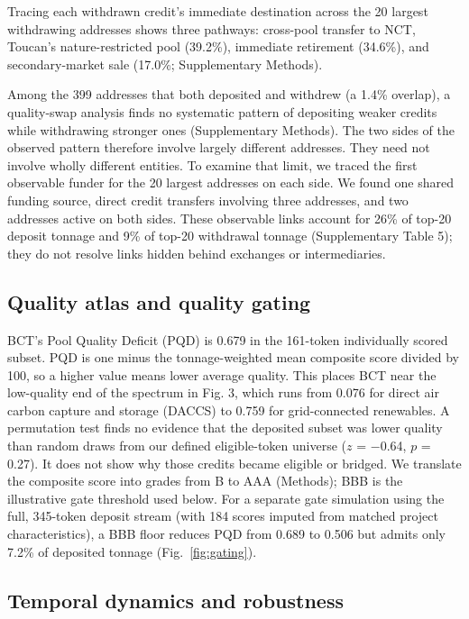 \documentclass[sn-nature,Numbered]{sn-jnl}
\begin{document}
Tracing each withdrawn credit's immediate destination across the 20 largest withdrawing addresses shows three pathways: cross-pool transfer to NCT, Toucan's nature-restricted pool (39.2\%), immediate retirement (34.6\%), and secondary-market sale (17.0\%; Supplementary Methods).

Among the 399 addresses that both deposited and withdrew (a 1.4\% overlap), a quality-swap analysis finds no systematic pattern of depositing weaker credits while withdrawing stronger ones (Supplementary Methods). The two sides of the observed pattern therefore involve largely different addresses. They need not involve wholly different entities. To examine that limit, we traced the first observable funder for the 20 largest addresses on each side. We found one shared funding source, direct credit transfers involving three addresses, and two addresses active on both sides. These observable links account for 26\% of top-20 deposit tonnage and 9\% of top-20 withdrawal tonnage (Supplementary Table 5); they do not resolve links hidden behind exchanges or intermediaries.

\subsection*{Quality atlas and quality gating}

BCT's Pool Quality Deficit (PQD) is 0.679 in the 161-token individually scored subset. PQD is one minus the tonnage-weighted mean composite score divided by 100, so a higher value means lower average quality. This places BCT near the low-quality end of the spectrum in Fig. 3, which runs from 0.076 for direct air carbon capture and storage (DACCS) to 0.759 for grid-connected renewables. A permutation test finds no evidence that the deposited subset was lower quality than random draws from our defined eligible-token universe ($z$ = $-$0.64, $p$ = 0.27). It does not show why those credits became eligible or bridged. We translate the composite score into grades from B to AAA (Methods); BBB is the illustrative gate threshold used below. For a separate gate simulation using the full, 345-token deposit stream (with 184 scores imputed from matched project characteristics), a BBB floor reduces PQD from 0.689 to 0.506 but admits only 7.2\% of deposited tonnage (Fig.~\ref{fig:gating}).


\subsection*{Temporal dynamics and robustness}
\end{document}

